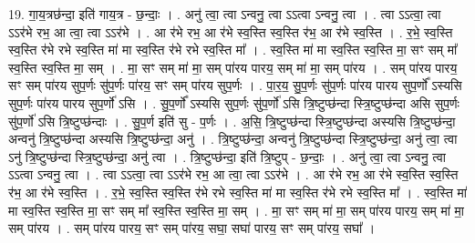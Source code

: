 \documentclass[17pt]{extarticle}
\begin{document}
19. गा॒य॒त्रछ॑न्दा॒ इति॑ गाय॒त्र - छ॒न्दाः॒ । . अनु॑ त्वा॒ त्वा ऽन्वनु॒ त्वा ऽऽत्वा ऽन्वनु॒ त्वा । . त्वा ऽऽत्वा॒ त्वा ऽऽर॑भे रभ॒ आ त्वा॒ त्वा ऽऽर॑भे । . आ र॑भे रभ॒ आ र॑भे स्व॒स्ति स्व॒स्ति र॑भ॒ आ र॑भे स्व॒स्ति । . र॒भे॒ स्व॒स्ति स्व॒स्ति र॑भे रभे स्व॒स्ति मा॑ मा स्व॒स्ति र॑भे रभे स्व॒स्ति मा᳚ । . स्व॒स्ति मा॑ मा स्व॒स्ति स्व॒स्ति मा॒ सꣳ सम् मा᳚ स्व॒स्ति स्व॒स्ति मा॒ सम् । . मा॒ सꣳ सम् मा॑ मा॒ सम् पा॑रय पारय॒ सम् मा॑ मा॒ सम् पा॑रय । . सम् पा॑रय पारय॒ सꣳ सम् पा॑रय सुप॒र्णः सु॑प॒र्णः पा॑रय॒ सꣳ सम् पा॑रय सुप॒र्णः । . पा॒र॒य॒ सु॒प॒र्णः सु॑प॒र्णः पा॑रय पारय सुप॒र्णो᳚ ऽस्यसि सुप॒र्णः पा॑रय पारय सुप॒र्णो॑ ऽसि । . सु॒प॒र्णो᳚ ऽस्यसि सुप॒र्णः सु॑प॒र्णो॑ ऽसि त्रि॒ष्टुप्छ॑न्दा स्त्रि॒ष्टुप्छ॑न्दा असि सुप॒र्णः सु॑प॒र्णो॑ ऽसि त्रि॒ष्टुप्छ॑न्दाः । . सु॒प॒र्ण इति॑ सु - प॒र्णः । . अ॒सि॒ त्रि॒ष्टुप्छ॑न्दा स्त्रि॒ष्टुप्छ॑न्दा अस्यसि त्रि॒ष्टुप्छ॑न्दा॒ अन्वनु॑ त्रि॒ष्टुप्छ॑न्दा अस्यसि त्रि॒ष्टुप्छ॑न्दा॒ अनु॑ । . त्रि॒ष्टुप्छ॑न्दा॒ अन्वनु॑ त्रि॒ष्टुप्छ॑न्दा स्त्रि॒ष्टुप्छ॑न्दा॒ अनु॑ त्वा॒ त्वा ऽनु॑ त्रि॒ष्टुप्छ॑न्दा स्त्रि॒ष्टुप्छ॑न्दा॒ अनु॑ त्वा । . त्रि॒ष्टुप्छ॑न्दा॒ इति॑ त्रि॒ष्टुप् - छ॒न्दाः॒ । . अनु॑ त्वा॒ त्वा ऽन्वनु॒ त्वा ऽऽत्वा ऽन्वनु॒ त्वा । . त्वा ऽऽत्वा॒ त्वा ऽऽर॑भे रभ॒ आ त्वा॒ त्वा ऽऽर॑भे । . आ र॑भे रभ॒ आ र॑भे स्व॒स्ति स्व॒स्ति र॑भ॒ आ र॑भे स्व॒स्ति । . र॒भे॒ स्व॒स्ति स्व॒स्ति र॑भे रभे स्व॒स्ति मा॑ मा स्व॒स्ति र॑भे रभे स्व॒स्ति मा᳚ । . स्व॒स्ति मा॑ मा स्व॒स्ति स्व॒स्ति मा॒ सꣳ सम् मा᳚ स्व॒स्ति स्व॒स्ति मा॒ सम् । . मा॒ सꣳ सम् मा॑ मा॒ सम् पा॑रय पारय॒ सम् मा॑ मा॒ सम् पा॑रय । . सम् पा॑रय पारय॒ सꣳ सम् पा॑रय॒ सघा॒ सघा॑ पारय॒ सꣳ सम् पा॑रय॒ सघा᳚ । \newline
\end{document}
